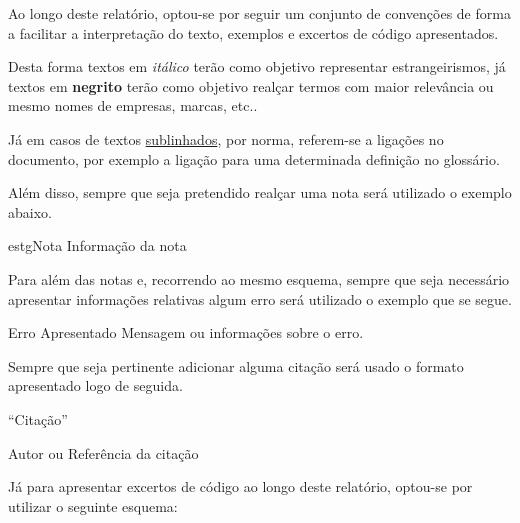 
Ao longo deste relatório, optou-se por seguir um conjunto de convenções de forma a facilitar a interpretação do texto, exemplos e excertos de código apresentados.

Desta forma textos em \textit{itálico} terão como objetivo representar estrangeirismos, já textos em \textbf{negrito} terão como objetivo realçar termos com maior relevância ou mesmo nomes de empresas, marcas, etc..

Já em casos de textos \underline{sublinhados}, por norma, referem-se a ligações no documento, por exemplo a ligação para uma determinada definição no glossário.

Além disso, sempre que seja pretendido realçar uma nota será utilizado o exemplo abaixo.

\vspace{0.01cm}

\begin{mybox}{estg}{Nota}
	Informação da nota
\end{mybox}

\vspace{0.1cm}

Para além das notas e, recorrendo ao mesmo esquema, sempre que seja necessário apresentar informações relativas algum erro será utilizado o exemplo que se segue.

\vspace{0.01cm}

\begin{errorbox}{Erro Apresentado}
Mensagem ou informações sobre o erro.
\end{errorbox}

\vspace{0.1cm}

Sempre que seja pertinente adicionar alguma citação será usado o formato apresentado logo de seguida.

\begin{quotebox}
	``Citação''

	\tcblower

	Autor ou Referência da citação
\end{quotebox}

\vspace{0.1cm}

Já para apresentar excertos de código ao longo deste relatório, optou-se por utilizar o seguinte esquema:

\vspace{0.01cm}


